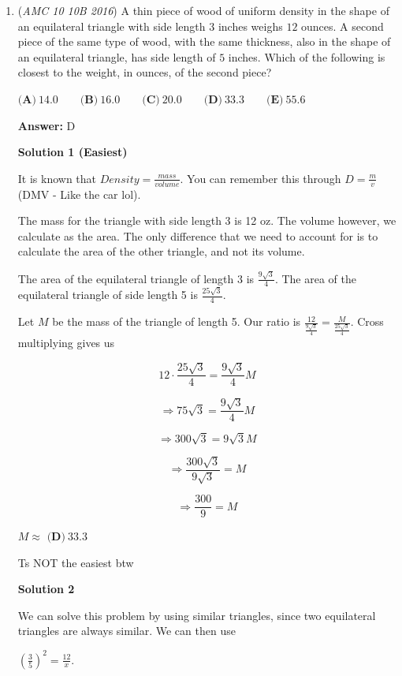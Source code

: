 \begin{enumerate}
 


	\item (\textit{AMC 10 10B 2016}) A thin piece of wood of uniform density in the shape of an equilateral triangle with side length $3$ inches weighs $12$ ounces. A second piece of the same type of wood, with the same thickness, also in the shape of an equilateral triangle, has side length of $5$ inches. Which of the following is closest to the weight, in ounces, of the second piece?


 $\textbf{(A)}\ 14.0\qquad\textbf{(B)}\ 16.0\qquad\textbf{(C)}\ 20.0\qquad\textbf{(D)}\ 33.3\qquad\textbf{(E)}\ 55.6$

 \textbf{Answer: }D



\textbf{Solution 1 (Easiest)}

It is known that \( Density = \frac{mass}{volume} \). You can remember this through \( D = \frac{m}{v} \) (DMV - Like the car lol).

 The mass for the triangle with side length 3 is 12 oz. The volume however, we calculate as the area. The only difference that we need to account for is to calculate the area of the other triangle, and not its volume.

 The area of the equilateral triangle of length 3 is \( \frac{9\sqrt{3}}{4} \). The area of the equilateral triangle of side length 5 is \( \frac{25\sqrt{3}}{4} \).

 Let \( M \) be the mass of the triangle of length 5. Our ratio is \( \frac{12}{\frac{9\sqrt{3}}{4}} = \frac{M}{\frac{25\sqrt{3}}{4}} \). Cross multiplying gives us

 
 \[12 \cdot \frac{25\sqrt{3}}{4} = \frac{9\sqrt{3}}{4} M\]

 \[\Rightarrow 75\sqrt{3} = \frac{9\sqrt{3}}{4} M\]

 \[\Rightarrow 300\sqrt{3} = 9\sqrt{3}M\]

 \[\Rightarrow \frac{300\sqrt{3}}{9\sqrt{3}} = M\]

 \[\Rightarrow \frac{300}{9} = M\]

 \( M \approx \) $\boxed{\textbf{(D)}\ 33.3}$

 
Ts NOT the easiest btw

 



\textbf{Solution 2}

We can solve this problem by using similar triangles, since two equilateral triangles are always similar. We can then use

 $\left(\frac{3}{5}\right)^2=\frac{12}{x}$.


\end{enumerate}
